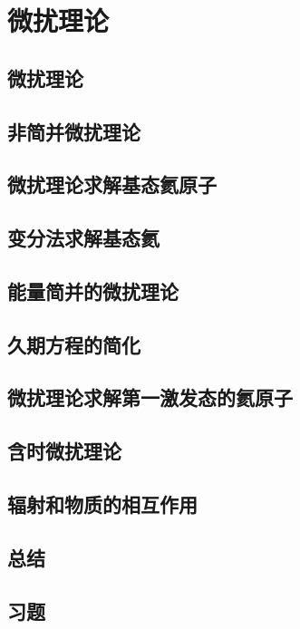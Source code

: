\chapter{微扰理论}
\label{chap:9}
\section{微扰理论}
\label{sec:9.1 Perturbation Theory}

\section{非简并微扰理论}
\label{sec:9.2 Nondegenerate Perturbation Theory}

\section{微扰理论求解基态氦原子}
\label{sec:9.3 Perturbation Treatment of the Helium-Atom Ground State}

\section{变分法求解基态氦}
\label{sec:9.4 Variational Treatments of the Ground State of Helium}

\section{能量简并的微扰理论}
\label{sec:9.4 Perturbation Theory for a Degenerate Energy Level}

\section{久期方程的简化}
\label{sec:9.5 Simplification of the Duration Equation}

\section{微扰理论求解第一激发态的氦原子}
\label{sec:9.6 Perturbation Treatment of the First Excited State of Helium}

\section{含时微扰理论}
\label{sec:9.7 Time-dependent Perturbation Theory}

\section{辐射和物质的相互作用}
\label{sec:9.8 Interaction of Radiation and Matter}

\section*{总结}

\section*{习题}